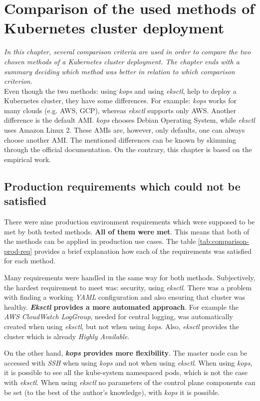 \section{Comparison of the used methods of Kubernetes cluster deployment}
\label{6-comp}
\textit{In this chapter, several comparison criteria are used in order to compare the two chosen methods of a Kubernetes cluster deployment. The chapter ends with a summary deciding which method was better in relation to which comparison criterion.}
\\

Even though the two methods: using \textit{kops} and using \textit{eksctl}, help to deploy a Kubernetes cluster, they have some differences. For example: \textit{kops} works for many clouds (e.g. AWS, GCP), whereas \textit{eksctl} supports only AWS. Another difference is the default AMI. \textit{kops} chooses Debian Operating System, while \textit{eksctl} uses Amazon Linux 2. These AMIs are, however, only defaults, one can always choose another AMI. The mentioned differences can be known by skimming through the official documentation. On the contrary, this chapter is based on the empirical work.

\subsection{Production requirements which could not be satisfied}

There were nine production environment requirements which were supposed to be met by both tested methods. \textbf{All of them were met}. This means that both of the methods can be applied in production use cases. The table \ref{tab:comparison-prod-req} provides a brief explanation how each of the requirements was satisfied for each method.

Many requirements were handled in the same way for both methods. Subjectively, the hardest requirement to meet was: security, using \textit{eksctl}. There was a problem with finding a working \textit{YAML} configuration and also ensuring that cluster was healthy. \textbf{\textit{Eksctl} provides a more automated approach}. For example the \textit{AWS CloudWatch LogGroup}, needed for central logging, was automatically created when using \textit{eksctl}, but not when using \textit{kops}. Also, \textit{eksctl} provides the cluster which is already \textit{Highly Available}.

On the other hand, \textbf{\textit{kops} provides more flexibility}. The master node can be accessed with \textit{SSH} when using \textit{kops} and not when using \textit{eksctl}. When using \textit{kops}, it is possible to see all the kube-system namespaced pods, which is not the case with \textit{eksctl}. When using \textit{eksctl} no parameters of the control plane components can be set (to the best of the author's knowledge), with \textit{kops} it is possible.

